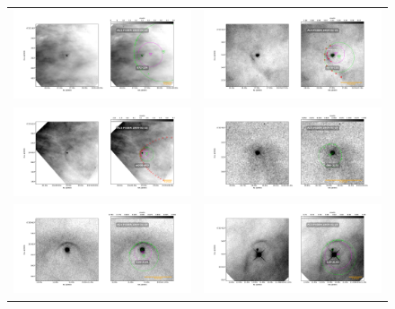 \documentclass{article}
\begin{document}
\begin{figure}[htp]
\centering
\begin{tabular}{l l}
     \includegraphics[width=0.5\linewidth]{j8oc09010_wcs/072-134-Bally_09-images.pdf}
    &\includegraphics[width=0.5\linewidth]{j8oc09010_wcs/4578-251-Bally_09-images.pdf}\\
    \includegraphics[width=0.5\linewidth]{j8oc09010_wcs/w000-400-Bally_09-images.pdf}
    &\includegraphics[width=0.5\linewidth]{j8oc14010_wcs/066-3251-Bally_14-images.pdf}\\
    \includegraphics[width=0.5\linewidth]{j8oc14010_wcs/116-3101-Bally_14-images.pdf}
   &\includegraphics[width=0.5\linewidth]{j8oc14010_wcs/119-3155-Bally_14-images.pdf}\\
    
\end{tabular}
\end{figure}
\end{document}

